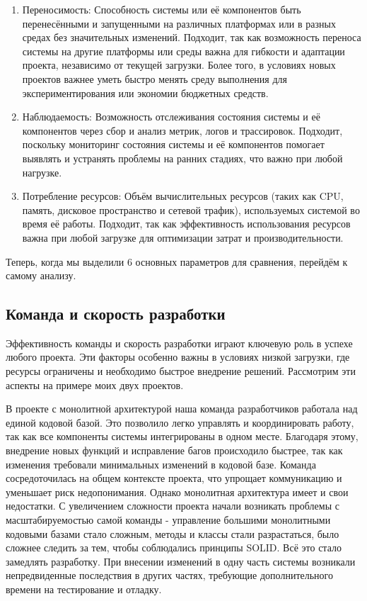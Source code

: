 \begin{enumerate}
        \item Переносимость: Способность системы или её компонентов быть перенесёнными и запущенными на различных платформах или в разных средах без значительных изменений. Подходит, так как возможность переноса системы на другие платформы или среды важна для гибкости и адаптации проекта, независимо от текущей загрузки. Более того, в условиях новых проектов важнее уметь быстро менять среду выполнения для экспериментирования или экономии бюджетных средств.
        \item Наблюдаемость: Возможность отслеживания состояния системы и её компонентов через сбор и анализ метрик, логов и трассировок. Подходит, поскольку мониторинг состояния системы и её компонентов помогает выявлять и устранять проблемы на ранних стадиях, что важно при любой нагрузке.
        \item Потребление ресурсов: Объём вычислительных ресурсов (таких как CPU, память, дисковое пространство и сетевой трафик), используемых системой во время её работы. Подходит, так как эффективность использования ресурсов важна при любой загрузке для оптимизации затрат и производительности.
    \end{enumerate}

    Теперь, когда мы выделили 6 основных параметров для сравнения, перейдём к самому анализу.

\subsection{Команда и скорость разработки}
    Эффективность команды и скорость разработки играют ключевую роль в успехе любого проекта. Эти факторы особенно важны в условиях низкой загрузки, где ресурсы ограничены и необходимо быстрое внедрение решений. Рассмотрим эти аспекты на примере моих двух проектов.

    В проекте с монолитной архитектурой наша команда разработчиков работала над единой кодовой базой. Это позволило легко управлять и координировать работу, так как все компоненты системы интегрированы в одном месте. Благодаря этому, внедрение новых функций и исправление багов происходило быстрее, так как изменения требовали минимальных изменений в кодовой базе. Команда сосредоточилась на общем контексте проекта, что упрощает коммуникацию и уменьшает риск недопонимания. Однако монолитная архитектура имеет и свои недостатки. С увеличением сложности проекта начали возникать проблемы с масштабируемостью самой команды - управление большими монолитными кодовыми базами стало сложным, методы и классы стали разрастаться, было сложнее следить за тем, чтобы соблюдались принципы SOLID. Всё это стало замедлять разработку. При внесении изменений в одну часть системы возникали непредвиденные последствия в других частях, требующие дополнительного времени на тестирование и отладку.
    
